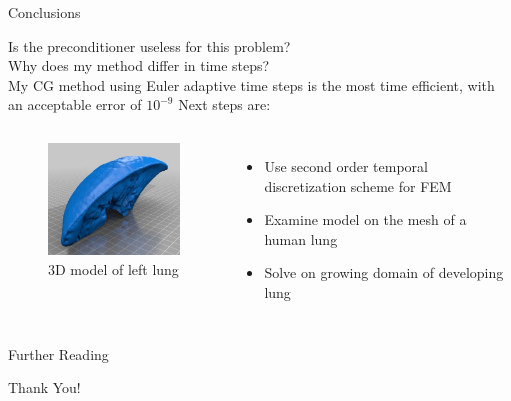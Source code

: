 \documentclass{beamer}
\begin{document}
        \begin{frame}{Conclusions}
        
            Is the preconditioner useless for this problem? \\ Why does my method differ in time steps? \\My CG method using Euler adaptive time steps is the most time efficient, with an acceptable error of $10^{-9}$ Next steps are:
            
            \vfill
            
            \begin{columns}
            
                \begin{figure}
                        \centering
                        \includegraphics[width = 5cm, frame]{Images/v2lung03.jpg}
                        \caption*{3D model of left lung}
                    \end{figure}
            
                \begin{itemize}
                \item Use second order temporal discretization scheme for FEM
                \item Examine model on the mesh of a human lung
                \item Solve on growing domain of developing lung 
                \end{itemize}
            
            \end{columns}
            \vfill
            
        \end{frame}
    
    
    
    
    
    
    
    
    
    
    
    
    
    
    
    
            \appendix
            
            \begin{frame}{Further Reading}
                \nocite{*}
                
                
            \end{frame}
    
            \begin{frame}[focus]
                \huge Thank You!\\
            \end{frame}
    
\end{document}

